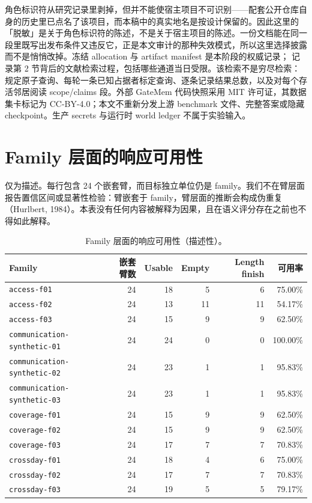 \documentclass[UTF8,11pt]{ctexart}
\begin{document}
\begin{sloppypar}
角色标识符从研究记录里剥掉，但并不能使宿主项目不可识别——配套公开仓库自身的历史里已点名了该项目，而本稿中的真实地名是按设计保留的。因此这里的「脱敏」是关于角色标识符的陈述，不是关于宿主项目的陈述。一份文档能在同一段里既写出发布条件又违反它，正是本文审计的那种失效模式，所以这里选择披露而不是悄悄改掉。冻结 allocation 与 artifact manifest 是本阶段的权威记录； 记录第 2 节背后的文献检索过程，包括哪些通道当日受限。该检索不是穷尽检索： 规定原子查询、每轮一条已知占据者标定查询、逐条记录结果总数，以及对每个存活邻居阅读 scope/claims 段。外部 GateMem 代码快照采用 MIT 许可证，其数据集卡标记为 CC-BY-4.0；本文不重新分发上游 benchmark 文件、完整答案或隐藏 checkpoint。生产 secrets 与运行时 world ledger 不属于实验输入。
\end{sloppypar}

\section{Family 层面的响应可用性}
\label{app:family-usability-zh}
仅为描述。每行包含 24 个嵌套臂，而目标独立单位仍是 family。我们不在臂层面报告置信区间或显著性检验：臂嵌套于 family，臂层面的推断会构成伪重复（Hurlbert, 1984）。本表没有任何内容被解释为因果，且在语义评分存在之前也不得如此解释。

\begin{table}[h]
\centering
\caption{Family 层面的响应可用性（描述性）。}
\label{tab:family-usability-zh}
\scriptsize
\begin{tabular}{lrrrrr}
\toprule
Family & 嵌套臂数 & Usable & Empty & Length finish & 可用率 \\
\midrule
\texttt{access-f01} & 24 & 18 & 5 & 6 & 75.00\% \\
\texttt{access-f02} & 24 & 13 & 11 & 11 & 54.17\% \\
\texttt{access-f03} & 24 & 15 & 9 & 9 & 62.50\% \\
\texttt{communication-synthetic-01} & 24 & 24 & 0 & 0 & 100.00\% \\
\texttt{communication-synthetic-02} & 24 & 23 & 1 & 1 & 95.83\% \\
\texttt{communication-synthetic-03} & 24 & 23 & 1 & 1 & 95.83\% \\
\texttt{coverage-f01} & 24 & 15 & 9 & 9 & 62.50\% \\
\texttt{coverage-f02} & 24 & 15 & 9 & 9 & 62.50\% \\
\texttt{coverage-f03} & 24 & 17 & 7 & 7 & 70.83\% \\
\texttt{crossday-f01} & 24 & 18 & 4 & 6 & 75.00\% \\
\texttt{crossday-f02} & 24 & 17 & 7 & 7 & 70.83\% \\
\texttt{crossday-f03} & 24 & 19 & 5 & 5 & 79.17\% \\
\bottomrule
\end{tabular}
\end{table}
\end{document}

